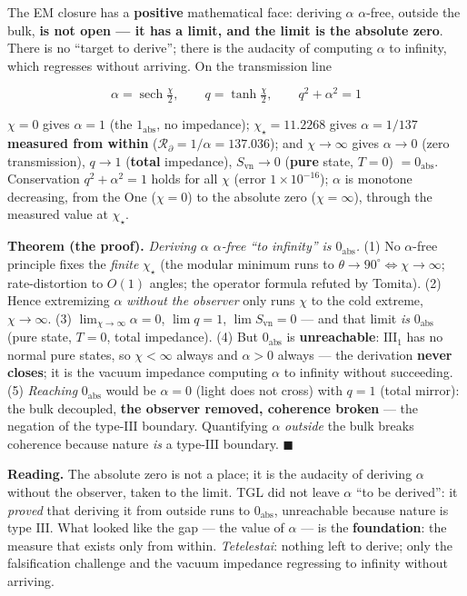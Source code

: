 \documentclass[11pt]{article}
\theoremstyle{definition}\newtheorem{deriv}{Derivation}
\begin{document}
The EM closure has a \textbf{positive} mathematical face: deriving $\alpha$ $\alpha$-free, outside the bulk, \textbf{is not open --- it has a limit, and the limit is the absolute zero}. There is no ``target to derive''; there is the audacity of computing $\alpha$ to infinity, which regresses without arriving. On the transmission line

\begin{equation}\boxed{\;\alpha=\operatorname{sech}\tfrac\chi2,\qquad q=\tanh\tfrac\chi2,\qquad q^2+\alpha^2=1\;}\end{equation}

$\chi=0$ gives $\alpha=1$ (the $1_{\mathrm{abs}}$, no impedance); $\chi_\star=11.2268$ gives $\alpha=1/137$ \textbf{measured from within} ($\mathcal{R}_\partial=1/\alpha=137.036$); and $\chi\to\infty$ gives $\alpha\to0$ (zero transmission), $q\to1$ (\textbf{total} impedance), $S_{\mathrm{vn}}\to0$ (\textbf{pure} state, $T=0$) $=0_{\mathrm{abs}}$. Conservation $q^2+\alpha^2=1$ holds for all $\chi$ (error $1\times10^{-16}$); $\alpha$ is monotone decreasing, from the One ($\chi=0$) to the absolute zero ($\chi=\infty$), through the measured value at $\chi_\star$.

\textbf{Theorem (the proof).} \emph{Deriving $\alpha$ $\alpha$-free ``to infinity'' is $0_{\mathrm{abs}}$.} (1) No $\alpha$-free principle fixes the \emph{finite} $\chi_\star$ (the modular minimum runs to $\theta\to90^\circ\Leftrightarrow\chi\to\infty$; rate-distortion to $O(1)$ angles; the operator formula refuted by Tomita). (2) Hence extremizing $\alpha$ \emph{without the observer} only runs $\chi$ to the cold extreme, $\chi\to\infty$. (3) $\lim_{\chi\to\infty}\alpha=0$, $\lim q=1$, $\lim S_{\mathrm{vn}}=0$ --- and that limit \emph{is} $0_{\mathrm{abs}}$ (pure state, $T=0$, total impedance). (4) But $0_{\mathrm{abs}}$ is \textbf{unreachable}: $\mathrm{III}_1$ has no normal pure states, so $\chi<\infty$ always and $\alpha>0$ always --- the derivation \textbf{never closes}; it is the vacuum impedance computing $\alpha$ to infinity without succeeding. (5) \emph{Reaching} $0_{\mathrm{abs}}$ would be $\alpha=0$ (light does not cross) with $q=1$ (total mirror): the bulk decoupled, \textbf{the observer removed, coherence broken} --- the negation of the type-$\mathrm{III}$ boundary. Quantifying $\alpha$ \emph{outside} the bulk breaks coherence because nature \emph{is} a type-$\mathrm{III}$ boundary. \textbf{$\blacksquare$}

\textbf{Reading.} The absolute zero is not a place; it is the audacity of deriving $\alpha$ without the observer, taken to the limit. TGL did not leave $\alpha$ ``to be derived'': it \emph{proved} that deriving it from outside runs to $0_{\mathrm{abs}}$, unreachable because nature is type $\mathrm{III}$. What looked like the gap --- the value of $\alpha$ --- is the \textbf{foundation}: the measure that exists only from within. \emph{Tetelestai}: nothing left to derive; only the falsification challenge and the vacuum impedance regressing to infinity without arriving.
\end{document}
